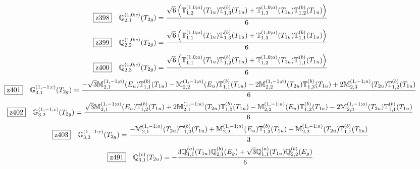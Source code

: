 \documentclass[fleqn,10pt,landscape]{jsarticle}
\begin{document}
\begin{dmath*}
\hspace*{3mm}\fbox{z398}\quad \mathbb{Q}_{2,1}^{(1,0;c)}(T_{2g})=\frac{\sqrt{6} \left(\mathbb{T}_{1,2}^{(1,0;a)}(T_{1u}) \mathbb{T}_{1,3}^{(b)}(T_{1u}) + \mathbb{T}_{1,3}^{(1,0;a)}(T_{1u}) \mathbb{T}_{1,2}^{(b)}(T_{1u})\right)}{6}
\end{dmath*}
\begin{dmath*}
\hspace*{3mm}\fbox{z399}\quad \mathbb{Q}_{2,2}^{(1,0;c)}(T_{2g})=\frac{\sqrt{6} \left(\mathbb{T}_{1,1}^{(1,0;a)}(T_{1u}) \mathbb{T}_{1,3}^{(b)}(T_{1u}) + \mathbb{T}_{1,3}^{(1,0;a)}(T_{1u}) \mathbb{T}_{1,1}^{(b)}(T_{1u})\right)}{6}
\end{dmath*}
\begin{dmath*}
\hspace*{3mm}\fbox{z400}\quad \mathbb{Q}_{2,3}^{(1,0;c)}(T_{2g})=\frac{\sqrt{6} \left(\mathbb{T}_{1,1}^{(1,0;a)}(T_{1u}) \mathbb{T}_{1,2}^{(b)}(T_{1u}) + \mathbb{T}_{1,2}^{(1,0;a)}(T_{1u}) \mathbb{T}_{1,1}^{(b)}(T_{1u})\right)}{6}
\end{dmath*}
\begin{dmath*}
\hspace*{3mm}\fbox{z401}\quad \mathbb{G}_{3,1}^{(1,-1;c)}(T_{2g})=\frac{- \sqrt{3} \mathbb{M}_{2,1}^{(1,-1;a)}(E_{u}) \mathbb{T}_{1,1}^{(b)}(T_{1u}) - \mathbb{M}_{2,2}^{(1,-1;a)}(E_{u}) \mathbb{T}_{1,1}^{(b)}(T_{1u}) - 2 \mathbb{M}_{2,2}^{(1,-1;a)}(T_{2u}) \mathbb{T}_{1,3}^{(b)}(T_{1u}) + 2 \mathbb{M}_{2,3}^{(1,-1;a)}(T_{2u}) \mathbb{T}_{1,2}^{(b)}(T_{1u})}{6}
\end{dmath*}
\begin{dmath*}
\hspace*{3mm}\fbox{z402}\quad \mathbb{G}_{3,2}^{(1,-1;c)}(T_{2g})=\frac{\sqrt{3} \mathbb{M}_{2,1}^{(1,-1;a)}(E_{u}) \mathbb{T}_{1,2}^{(b)}(T_{1u}) + 2 \mathbb{M}_{2,1}^{(1,-1;a)}(T_{2u}) \mathbb{T}_{1,3}^{(b)}(T_{1u}) - \mathbb{M}_{2,2}^{(1,-1;a)}(E_{u}) \mathbb{T}_{1,2}^{(b)}(T_{1u}) - 2 \mathbb{M}_{2,3}^{(1,-1;a)}(T_{2u}) \mathbb{T}_{1,1}^{(b)}(T_{1u})}{6}
\end{dmath*}
\begin{dmath*}
\hspace*{3mm}\fbox{z403}\quad \mathbb{G}_{3,3}^{(1,-1;c)}(T_{2g})=\frac{- \mathbb{M}_{2,1}^{(1,-1;a)}(T_{2u}) \mathbb{T}_{1,2}^{(b)}(T_{1u}) + \mathbb{M}_{2,2}^{(1,-1;a)}(E_{u}) \mathbb{T}_{1,3}^{(b)}(T_{1u}) + \mathbb{M}_{2,2}^{(1,-1;a)}(T_{2u}) \mathbb{T}_{1,1}^{(b)}(T_{1u})}{3}
\end{dmath*}
\begin{dmath*}
\hspace*{3mm}\fbox{z491}\quad \mathbb{Q}_{3,1}^{(c)}(T_{2u})=- \frac{3 \mathbb{Q}_{1,1}^{(a)}(T_{1u}) \mathbb{Q}_{2,1}^{(b)}(E_{g}) + \sqrt{3} \mathbb{Q}_{1,1}^{(a)}(T_{1u}) \mathbb{Q}_{2,2}^{(b)}(E_{g})}{6}
\end{dmath*}
\end{document}
